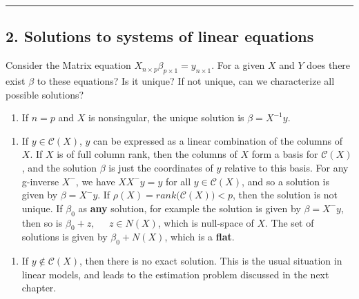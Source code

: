 \documentclass[
]{book}
\providecommand{\tightlist}{%
  \setlength{\itemsep}{0pt}\setlength{\parskip}{0pt}}
\begin{document}
{{{\begin{center}\rule{0.5\linewidth}{0.5pt}\end{center}

\hypertarget{solutions-to-systems-of-linear-equations}{%
\subsection{2. Solutions to systems of linear equations}\label{solutions-to-systems-of-linear-equations}}

Consider the Matrix equation \(X_{n \times p} \beta_{p \times 1} = y_{n \times 1}\). For a given \(X\) and \(Y\) does there exist \(\beta\) to these equations? Is it unique? If not unique, can we characterize all possible solutions?

\begin{enumerate}
\def\labelenumi{\arabic{enumi}.}
\tightlist
\item
  If \(n=p\) and \(X\) is nonsingular, the unique solution is \(\beta = X^{-1} y\).
\end{enumerate}

\begin{enumerate}
\def\labelenumi{\arabic{enumi}.}
\setcounter{enumi}{1}
\tightlist
\item
  If \(y \in \mathcal{C}(X)\), \(y\) can be expressed as a linear combination of the columns of \(X\). If \(X\) is of full column rank, then the columns of \(X\) form a basis for \(\mathcal{C}(X)\), and the solution \(\beta\) is just the coordinates of \(y\) relative to this basis. For any g-inverse \(X^-\), we have \(XX^- y = y\) for all \(y \in \mathcal{C}(X)\), and so a solution is given by \(\beta=X^- y\). If \(\rho (X) = rank \Big( \mathcal{C}(X) \Big) < p\), then the solution is not unique. If \(\beta_0\) as \textbf{any} solution, for example the solution is given by \(\beta=X^- y\), then so is \(\beta_0 + z, \;\;\;\;\; z\in N(X)\), which is null-space of \(X\). The set of solutions is given by \(\beta_0 + N(X)\), which is a \textbf{flat}.
\end{enumerate}

\begin{enumerate}
\def\labelenumi{\arabic{enumi}.}
\setcounter{enumi}{2}
\tightlist
\item
  If \(y \not \in \mathcal{C}(X)\), then there is no exact solution. This is the usual situation in linear models, and leads to the estimation problem discussed in the next chapter.
\end{enumerate}

}}}
\end{document}

